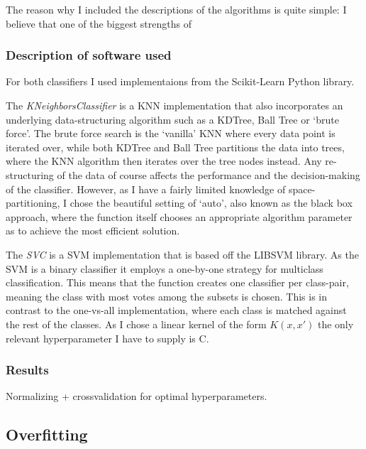 \documentclass{article}
\theoremstyle{plain}
\theoremstyle{nonumberplain}
\begin{document}
The reason why I included the descriptions of the algorithms is quite simple: I believe that one of the biggest strengths of 


\subsubsection{Description of software used}
For both classifiers I used implementaions from the Scikit-Learn Python library\cite{website:sklearn}.

The \textit{KNeighborsClassifier} is a KNN implementation that also incorporates an underlying data-structuring algorithm such as a KDTree, Ball Tree or `brute force'\cite{website:knn-sklearn}. 
The brute force search is the `vanilla' KNN where every data point is iterated over, while both KDTree and Ball Tree partitions the data into trees, where the KNN algorithm then iterates over the tree nodes instead. 
Any re-structuring of the data of course affects the performance and the decision-making of the classifier. 
However, as I have a fairly limited knowledge of space-partitioning, I chose the beautiful setting of `auto', also known as the black box approach, where the function itself chooses an appropriate algorithm parameter as to achieve the most efficient solution.

The \textit{SVC}\cite{website:svm-sklearn} is a SVM implementation that is based off the LIBSVM \cite{website:libsvm} library. As the SVM is a binary classifier it employs a one-by-one strategy for multiclass classification. This means that the function creates one classifier per class-pair, meaning the class with most votes among the subsets is chosen. This is in contrast to the one-vs-all implementation, where each class is matched against the rest of the classes. As I chose a linear kernel of the form $K(x,x')$ the only relevant hyperparameter I have to supply is C. 


\subsubsection{Results}
Normalizing + crossvalidation for optimal hyperparameters.

\subsection{Overfitting}






\end{document}
